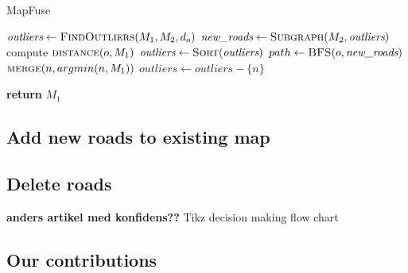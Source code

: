 
\begin{algorithm}[H]
    \caption{MapFuse}
    \label{alg:mapfuse}
    \begin{algorithmic}
    
    \State $\textit{outliers} \gets \textsc{FindOutliers}(M_1, M_2, d_o)$
    \State $\textit{new\_roads} \gets \textsc{Subgraph}(M_2, \textit{outliers})$
        \State compute $\textsc{distance}(o, M_1)$
    \EndFor
    \State $\textit{outliers} \gets \textsc{Sort}(\textit{outliers})$ 
        \State $path \gets \textsc{BFS}(o, \textit{new\_roads})$
                \State $\textsc{merge}(n, argmin(n, M_1))$
            \EndIf
            \State $\textit{outliers} \gets \textit{outliers} - \{n\}$ 
        \EndFor
    \EndFor
    
    \State \textbf{return} $M_1$
\EndFunction
\end{algorithmic}
\end{algorithm}



\subsection{Add new roads to existing map}


\subsection{Delete roads}

\textbf{anders artikel med konfidens??}
Tikz decision making flow chart


\subsection{Our contributions}

